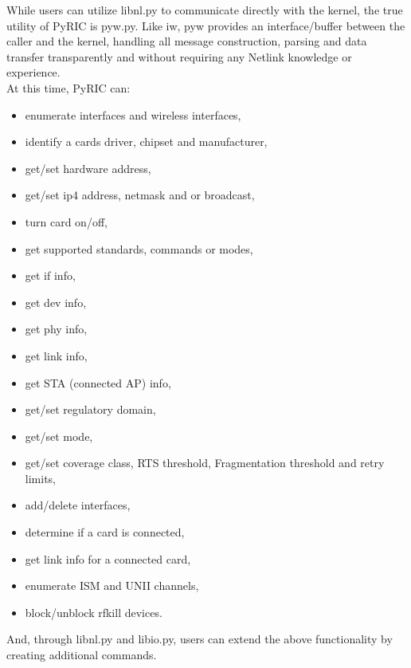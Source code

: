 \documentclass[11pt]{article}
\begin{document}
While users can utilize libnl.py to communicate directly with the kernel, the
true utility of PyRIC is pyw.py. Like iw, pyw provides an interface/buffer 
between the caller and the kernel, handling all message construction, parsing 
and data transfer transparently and without requiring any Netlink knowledge or 
experience. \\

At this time, PyRIC can:
\begin{itemize}
\item enumerate interfaces and wireless interfaces,
\item identify a cards driver, chipset and manufacturer,
\item get/set hardware address,
\item get/set ip4 address, netmask and or broadcast,
\item turn card on/off,
\item get supported standards, commands or modes,
\item get if info,
\item get dev info,
\item get phy info,
\item get link info,
\item get STA (connected AP) info,
\item get/set regulatory domain,
\item get/set mode,
\item get/set coverage class, RTS threshold, Fragmentation threshold and retry 
limits,
\item add/delete interfaces,
\item determine if a card is connected,
\item get link info for a connected card,
\item enumerate ISM and UNII channels,
\item block/unblock rfkill devices.
\end{itemize}
And, through libnl.py and libio.py, users can extend the above functionality by
creating additional commands.
\end{document}
